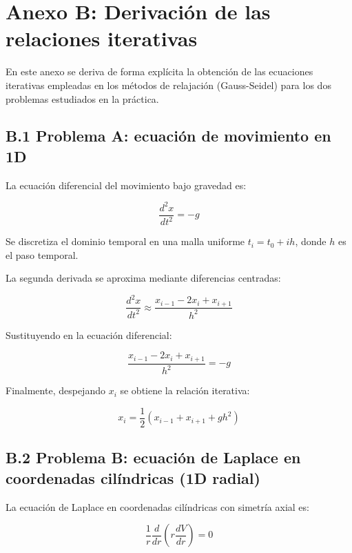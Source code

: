 \documentclass[12pt]{article}
\begin{document}
\newpage
\section*{Anexo B: Derivación de las relaciones iterativas}

En este anexo se deriva de forma explícita la obtención de las ecuaciones iterativas empleadas en los métodos de relajación (Gauss-Seidel) para los dos problemas estudiados en la práctica.

\subsection*{B.1 Problema A: ecuación de movimiento en 1D}

La ecuación diferencial del movimiento bajo gravedad es:

\begin{equation}
\frac{d^2 x}{dt^2} = -g
\end{equation}

Se discretiza el dominio temporal en una malla uniforme $t_i = t_0 + i h$, donde $h$ es el paso temporal.

La segunda derivada se aproxima mediante diferencias centradas:

\begin{equation}
\frac{d^2 x}{dt^2} \approx \frac{x_{i-1} - 2x_i + x_{i+1}}{h^2}
\end{equation}

Sustituyendo en la ecuación diferencial:

\begin{equation}
\frac{x_{i-1} - 2x_i + x_{i+1}}{h^2} = -g
\end{equation}


Finalmente, despejando $x_i$ se obtiene la relación iterativa:

\begin{equation}
x_i = \frac{1}{2}\left(x_{i-1} + x_{i+1} + g h^2 \right)
\end{equation}

\subsection*{B.2 Problema B: ecuación de Laplace en coordenadas cilíndricas (1D radial)}

La ecuación de Laplace en coordenadas cilíndricas con simetría axial es:

\begin{equation}
\frac{1}{r}\frac{d}{dr}\left(r \frac{dV}{dr}\right) = 0
\end{equation}
\end{document}
